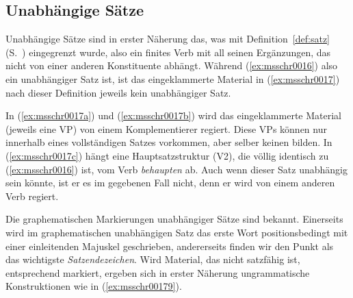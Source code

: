\subsection{Unabhängige Sätze}

\label{sec:hauptsatzschreib}

Unabhängige Sätze sind in erster Näherung das, was mit Definition~\ref{def:satz} (S.~\pageref{def:satz}) eingegrenzt wurde, also ein finites Verb mit all seinen Ergänzungen, das nicht von einer anderen Konstituente abhängt.
Während (\ref{ex:msschr0016}) also ein unabhängiger Satz ist, ist das eingeklammerte Material in (\ref{ex:msschr0017}) nach dieser Definition jeweils kein unabhängiger Satz.

\begin{exe}
  \ex\label{ex:msschr0017}
  \begin{xlist}
  \end{xlist}
\end{exe}

In (\ref{ex:msschr0017a}) und (\ref{ex:msschr0017b}) wird das eingeklammerte Material (jeweils eine VP) von einem Komplementierer regiert.
Diese VPs können nur innerhalb eines vollständigen Satzes vorkommen, aber selber keinen bilden.
In (\ref{ex:msschr0017c}) hängt eine Hauptsatzstruktur (V2), die völlig identisch zu (\ref{ex:msschr0016}) ist, vom Verb \textit{behaupten} ab.
Auch wenn dieser Satz unabhängig sein könnte, ist er es im gegebenen Fall nicht, denn er wird von einem anderen Verb regiert.

Die graphematischen Markierungen unabhängiger Sätze sind bekannt.
Einerseits wird im graphematischen unabhängigen Satz das erste Wort positionsbedingt mit einer einleitenden Majuskel geschrieben, andererseits finden wir den Punkt als das wichtigste \textit{Satzendezeichen}.
Wird Material, das nicht satzfähig ist, entsprechend markiert, ergeben sich in erster Näherung ungrammatische Konstruktionen wie in (\ref{ex:msschr00179}).


\begin{exe}
  \ex\label{ex:msschr00179}
  \begin{xlist}
  \end{xlist}
\end{exe}

